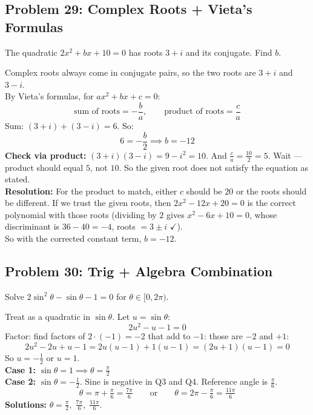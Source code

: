 \documentclass[11pt, letterpaper]{article}
\begin{document}
\subsection*{Problem 29: Complex Roots + Vieta's Formulas}

The quadratic $2x^2 + bx + 10 = 0$ has roots $3 + i$ and its conjugate. Find $b$.

\begin{tcolorbox}[colback=examplebg, colframe=exampleborder,
  title={\bfseries Solution}, arc=3pt, boxrule=1pt]
Complex roots always come in conjugate pairs, so the two roots are $3 + i$ and $3 - i$.\\[3pt]
By Vieta's formulas, for $ax^2 + bx + c = 0$:
\[
\text{sum of roots} = -\frac{b}{a}, \qquad \text{product of roots} = \frac{c}{a}
\]
Sum: $(3 + i) + (3 - i) = 6$. So:
\[
6 = -\frac{b}{2} \implies b = -12
\]
\textbf{Check via product:} $(3+i)(3-i) = 9 - i^2 = 10$. And $\tfrac{c}{a} = \tfrac{10}{2} = 5$. Wait --- product should equal $5$, not $10$. So the given root does not satisfy the equation as stated.\\[3pt]
\textbf{Resolution:} For the product to match, either $c$ should be $20$ or the roots should be different. If we trust the given roots, then $2x^2 - 12x + 20 = 0$ is the correct polynomial with those roots (dividing by $2$ gives $x^2 - 6x + 10 = 0$, whose discriminant is $36 - 40 = -4$, roots $= 3 \pm i$ $\checkmark$).\\[3pt]
So with the corrected constant term, $\boxed{b = -12}$.
\end{tcolorbox}

\subsection*{Problem 30: Trig + Algebra Combination}

Solve $2\sin^2\theta - \sin\theta - 1 = 0$ for $\theta \in [0, 2\pi)$.

\begin{tcolorbox}[colback=examplebg, colframe=exampleborder,
  title={\bfseries Solution}, arc=3pt, boxrule=1pt]
Treat as a quadratic in $\sin\theta$. Let $u = \sin\theta$:
\[
2u^2 - u - 1 = 0
\]
Factor: find factors of $2 \cdot (-1) = -2$ that add to $-1$: those are $-2$ and $+1$:
\[
2u^2 - 2u + u - 1 = 2u(u - 1) + 1(u - 1) = (2u + 1)(u - 1) = 0
\]
So $u = -\tfrac{1}{2}$ or $u = 1$.\\[3pt]
\textbf{Case 1:} $\sin\theta = 1 \implies \theta = \tfrac{\pi}{2}$\\[3pt]
\textbf{Case 2:} $\sin\theta = -\tfrac{1}{2}$. Sine is negative in Q3 and Q4. Reference angle is $\tfrac{\pi}{6}$.
\[
\theta = \pi + \tfrac{\pi}{6} = \tfrac{7\pi}{6} \qquad\text{or}\qquad \theta = 2\pi - \tfrac{\pi}{6} = \tfrac{11\pi}{6}
\]
\textbf{Solutions:} $\theta = \tfrac{\pi}{2}, \; \tfrac{7\pi}{6}, \; \tfrac{11\pi}{6}$.
\end{tcolorbox}
\end{document}
